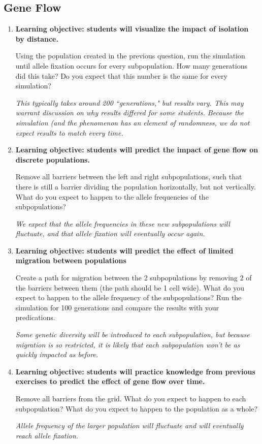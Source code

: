\documentclass[12pt]{article}
\begin{document}
\begin{spacing}{1.5}
\subsection{Gene Flow}
\begin{enumerate}
\item
\par \textbf{Learning objective: students will visualize the impact of isolation by distance.}
\par Using the population created in the previous question, run the simulation until allele fixation occurs for every subpopulation. How many generations did this take? Do you expect that this number is the same for every simulation?
\par \textit{This typically takes around 200 ``generations," but results vary. This may warrant discussion on why results differed for some students. Because the simulation (and the phenomenon has an element of randomness, we do not expect results to match every time.}
\item
\par \textbf{Learning objective: students will predict the impact of gene flow on discrete populations.}
\par Remove all barriers between the left and right subpopulations, such that there is still a barrier dividing the population horizontally, but not vertically. What do you expect to happen to the allele frequencies of the subpopulations?
\par \textit{We expect that the allele frequencies in these new subpopulations will fluctuate, and that allele fixation will eventually occur again.}
\item
\par \textbf{Learning objective: students will predict the effect of limited migration between populations}
\par Create a path for migration between the 2 subpopulations by removing 2 of the barriers between them (the path should be 1 cell wide). What do you expect to happen to the allele frequency of the subpopulations? Run the simulation for 100 generations and compare the results with your predications.
\par \textit{Some genetic diversity will be introduced to each subpopulation, but because migration is so restricted, it is likely that each subpopulation won't be as quickly impacted as before.}
\item
\par \textbf{Learning objective: students will practice knowledge from previous exercises to predict the effect of gene flow over time.}
\par Remove all barriers from the grid. What do you expect to happen to each subpopulation? What do you expect to happen to the population as a whole?
\par \textit{Allele frequency of the larger population will fluctuate and will eventually reach allele fixation.}
\end{enumerate}


\end{spacing}
\end{document}
